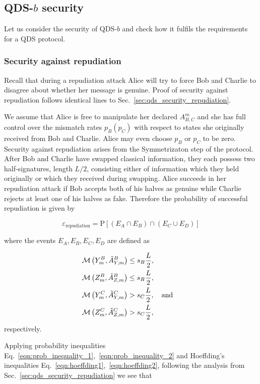 \subsection{QDS-$b$ security}
Let us consider the security of QDS-$b$ and check how it fulfils the requirements for a QDS protocol. 

\subsubsection{Security against repudiation}
Recall that during a repudiation attack Alice will try to force Bob and Charlie to disagree about whether her message is genuine. Proof of security against repudiation follows identical lines to Sec.~\ref{sec:qds_security_repudiation}.

We assume that Alice is free to manipulate her declared $A_{B, C}^m$ and she has full control over the mismatch rates $p_B \left(p_C\right)$ with respect to states she originally received from Bob and Charlie. Alice may even choose $p_B$ or $p_C$ to be zero. Security against repudiation arises from the Symmetrizaton step of the protocol. After Bob and Charlie have swapped classical information, they each possess two half-signatures, length $L/2$, consisting either of information which they held originally or which they received during swapping. Alice succeeds in her repudiation attack if Bob accepts both of his halves as genuine while Charlie rejects at least one of his halves as fake. Therefore the probability of successful repudiation is given by

\begin{equation}
\varepsilon_{\text{repudiation}} = \text{P}\left[\left(E_A \cap E_B\right) \cap \left(E_C \cup E_D\right) \right]
\end{equation}

\noindent where the events $E_A, E_B, E_C, E_D$ are defined as

\begin{align}
&\mathcal{M}\left(Y_m^B, \tilde{A}_{Y, m}^B\right) \le s_B \frac{L}{2}, \notag \\
%
&\mathcal{M}\left(Z_m^B, \tilde{A}_{Z, m}^B\right) \le s_B \frac{L}{2}, \notag \\
%
&\mathcal{M}\left(Y_m^C, \tilde{A}_{Y, m}^C\right) > s_C \frac{L}{2}, \qq{and}\notag \\
%
&\mathcal{M}\left(Z_m^C, \tilde{A}_{Z, m}^C\right) > s_C \frac{L}{2},
\end{align}
respectively.

Applying probability inequalities Eq.~\ref{eqn:prob_inequality_1},~\ref{eqn:prob_inequality_2} and Hoeffding's inequalities Eq.~\ref{eqn:hoeffding1},~\ref{eqn:hoeffding2}, following the analysis from Sec.~\ref{sec:qds_security_repudiation} we see that

